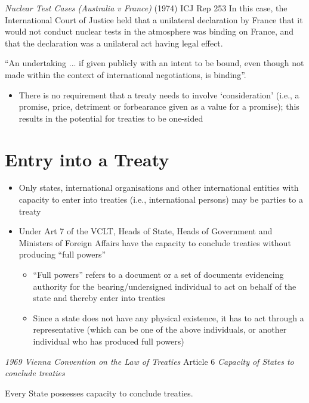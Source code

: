 \begin{casedetails}{\textit{Nuclear Test Cases (Australia v France)} (1974) ICJ Rep 253}
    \flushleft
    In this case, the International Court of Justice held that a unilateral declaration by France that it would not conduct nuclear tests in the atmosphere was binding on France, and that the declaration was a unilateral act having legal effect.
    
    \vspace{\baselineskip}

    ``An undertaking ... if given publicly with an intent to be bound, even though not made within the context of international negotiations, is binding''.
\end{casedetails}

\begin{itemize}
    \item There is no requirement that a treaty needs to involve `consideration' (i.e., a promise, price, detriment or forbearance given as a value for a promise); this results in the potential for treaties to be one-sided
\end{itemize}

\section{Entry into a Treaty}
\begin{itemize}
    \item Only states, international organisations and other international entities with capacity to enter into treaties (i.e., international persons) may be parties to a treaty
    \item Under Art 7 of the VCLT, Heads of State, Heads of Government and Ministers of Foreign Affairs have the capacity to conclude treaties without producing ``full powers''
    \begin{itemize}
        \item ``Full powers'' refers to a document or a set of documents evidencing authority for the bearing/undersigned individual to act on behalf of the state and thereby enter into treaties
        \item Since a state does not have any physical existence, it has to act through a representative (which can be one of the above individuals, or another individual who has produced full powers)
    \end{itemize}
\end{itemize}

\begin{conventiondetails}{\textit{1969 Vienna Convention on the Law of Treaties} Article 6}\label{VCLT Art 6}
    \textit{Capacity of States to conclude treaties}

    \vspace{\baselineskip}

    Every State possesses capacity to conclude treaties. 
\end{conventiondetails}

